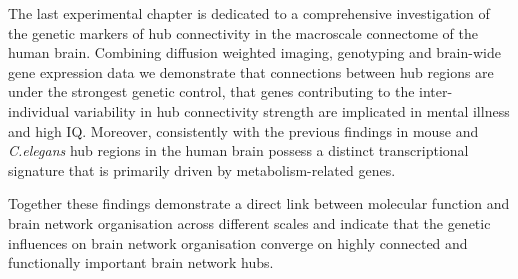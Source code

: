 The last experimental chapter is dedicated to a comprehensive investigation of the genetic markers of hub connectivity in the macroscale connectome of the human brain. Combining diffusion weighted imaging, genotyping and brain-wide gene expression data we demonstrate that connections between hub regions are under the strongest genetic control, that genes contributing to the inter-individual variability in hub connectivity strength are implicated in mental illness and high IQ. Moreover, consistently with the previous findings in mouse and \textit{C.elegans} hub regions in the human brain possess a distinct transcriptional signature that is primarily driven by metabolism-related genes.

Together these findings demonstrate a direct link between molecular function and brain network organisation across different scales and indicate that the genetic influences on brain network organisation converge on highly connected and functionally important brain network hubs. 

